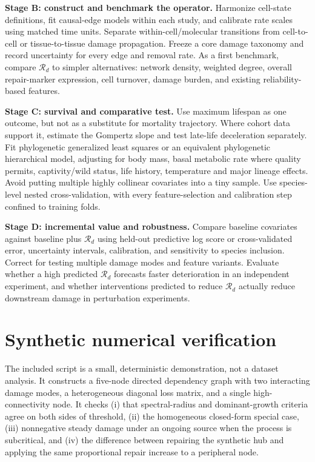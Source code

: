 \documentclass[11pt,a4paper]{article}
\newcommand{\Rd}{\mathcal{R}_{d}}
\begin{document}
\textbf{Stage B: construct and benchmark the operator.} Harmonize cell-state definitions, fit causal-edge models within each study, and calibrate rate scales using matched time units. Separate within-cell/molecular transitions from cell-to-cell or tissue-to-tissue damage propagation. Freeze a core damage taxonomy and record uncertainty for every edge and removal rate. As a first benchmark, compare $\Rd$ to simpler alternatives: network density, weighted degree, overall repair-marker expression, cell turnover, damage burden, and existing reliability-based features.

\textbf{Stage C: survival and comparative test.} Use maximum lifespan as one outcome, but not as a substitute for mortality trajectory. Where cohort data support it, estimate the Gompertz slope and test late-life deceleration separately. Fit phylogenetic generalized least squares or an equivalent phylogenetic hierarchical model, adjusting for body mass, basal metabolic rate where quality permits, captivity/wild status, life history, temperature and major lineage effects. Avoid putting multiple highly collinear covariates into a tiny sample. Use species-level nested cross-validation, with every feature-selection and calibration step confined to training folds.

\textbf{Stage D: incremental value and robustness.} Compare baseline covariates against baseline plus $\Rd$ using held-out predictive log score or cross-validated error, uncertainty intervals, calibration, and sensitivity to species inclusion. Correct for testing multiple damage modes and feature variants. Evaluate whether a high predicted $\Rd$ forecasts faster deterioration in an independent experiment, and whether interventions predicted to reduce $\Rd$ actually reduce downstream damage in perturbation experiments.

\section{Synthetic numerical verification}
The included script is a small, deterministic demonstration, not a dataset analysis. It constructs a five-node directed dependency graph with two interacting damage modes, a heterogeneous diagonal loss matrix, and a single high-connectivity node. It checks (i) that spectral-radius and dominant-growth criteria agree on both sides of threshold, (ii) the homogeneous closed-form special case, (iii) nonnegative steady damage under an ongoing source when the process is subcritical, and (iv) the difference between repairing the synthetic hub and applying the same proportional repair increase to a peripheral node.
\end{document}
